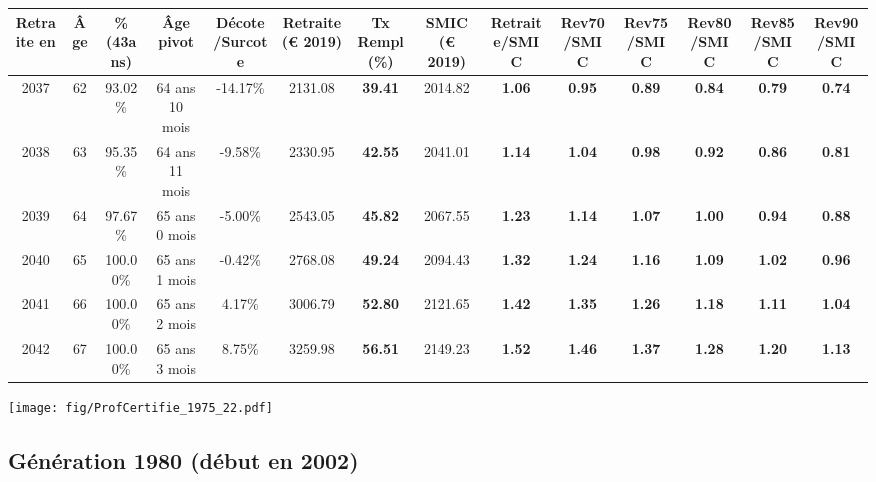 \begin{adjustbox}{max width=\textwidth} 
\begin{tabular}[htb]{|c|c||c|c|c||c|c||c||c|c|c|c|c|c|} 
\hline 
 Retraite en &  Âge &  \%(43ans) &  Âge pivot &  Décote/Surcote &  Retraite (\euro{} 2019) &  Tx Rempl(\%) &  SMIC (\euro{} 2019) &  Retraite/SMIC &  Rev70/SMIC &  Rev75/SMIC &  Rev80/SMIC &  Rev85/SMIC &  Rev90/SMIC \\ 
\hline \hline 
 2037 &  62 &  93.02\% &  64 ans 10 mois &  -14.17\% &  2131.08 &  {\bf 39.41} &  2014.82 &  {\bf 1.06} &  {\bf {\color{red} 0.95}} &  {\bf {\color{red} 0.89}} &  {\bf {\color{red} 0.84}} &  {\bf {\color{red} 0.79}} &  {\bf {\color{red} 0.74}} \\ 
\hline 
 2038 &  63 &  95.35\% &  64 ans 11 mois &  -9.58\% &  2330.95 &  {\bf 42.55} &  2041.01 &  {\bf 1.14} &  {\bf 1.04} &  {\bf {\color{red} 0.98}} &  {\bf {\color{red} 0.92}} &  {\bf {\color{red} 0.86}} &  {\bf {\color{red} 0.81}} \\ 
\hline 
 2039 &  64 &  97.67\% &  65 ans 0 mois &  -5.00\% &  2543.05 &  {\bf 45.82} &  2067.55 &  {\bf 1.23} &  {\bf 1.14} &  {\bf 1.07} &  {\bf 1.00} &  {\bf {\color{red} 0.94}} &  {\bf {\color{red} 0.88}} \\ 
\hline 
 2040 &  65 &  100.00\% &  65 ans 1 mois &  -0.42\% &  2768.08 &  {\bf 49.24} &  2094.43 &  {\bf 1.32} &  {\bf 1.24} &  {\bf 1.16} &  {\bf 1.09} &  {\bf 1.02} &  {\bf {\color{red} 0.96}} \\ 
\hline 
 2041 &  66 &  100.00\% &  65 ans 2 mois &  4.17\% &  3006.79 &  {\bf 52.80} &  2121.65 &  {\bf 1.42} &  {\bf 1.35} &  {\bf 1.26} &  {\bf 1.18} &  {\bf 1.11} &  {\bf 1.04} \\ 
\hline 
 2042 &  67 &  100.00\% &  65 ans 3 mois &  8.75\% &  3259.98 &  {\bf 56.51} &  2149.23 &  {\bf 1.52} &  {\bf 1.46} &  {\bf 1.37} &  {\bf 1.28} &  {\bf 1.20} &  {\bf 1.13} \\ 
\hline 
\hline 
\end{tabular} 
\end{adjustbox} 
 
 \vspace{0.1cm} 

 \begin{center}\texttt{[image: fig/ProfCertifie\_1975\_22.pdf]}\end{center} \label{fig/ProfCertifie_1975_22.pdf} 

\newpage 
 
\subsection{Génération 1980 (début en 2002)} 

